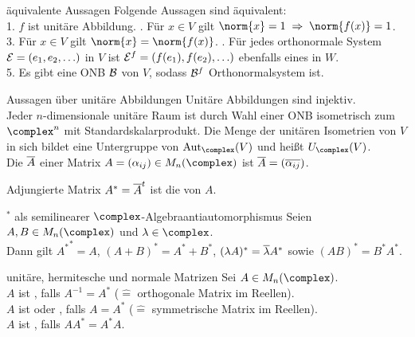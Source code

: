 \begin{Satz}{äquivalente Aussagen}
    Folgende Aussagen sind äquivalent: \\
    1. $f$ ist unitäre Abbildung. . Für $x \in V$ gilt
    $\norm{x} = 1 \;\Rightarrow\; \norm{f(x)} = 1$. \\
    3. Für $x \in V$ gilt $\norm{x} = \norm{f(x)}$. . Für jedes orthonormale System $\mathcal{E} = (e_1, e_2, \ldots)$ in $V$
    ist $\mathcal{E}^f = (f(e_1), f(e_2), \ldots)$ ebenfalls eines in $W$. \\
    5. Es gibt eine ONB $\mathcal{B}$ von $V$, sodass $\mathcal{B}^f$
    Orthonormalsystem ist.
\end{Satz}

\begin{Satz}{Aussagen über unitäre Abbildungen}
    Unitäre Abbildungen sind injektiv. \\
    Jeder $n$-dimen\-sionale unitäre Raum ist durch Wahl einer ONB isometrisch
    zum $\complex^n$ mit Standardskalarprodukt.
    Die Menge der unitären Isometrien von $V$ in sich bildet eine Untergruppe
    von $\Aut_\complex(V)$ und heißt 
    $U_\complex(V)$. \\
    Die  $\overline{A}$ einer Matrix
    $A = (\alpha_{ij}) \in M_n(\complex)$ ist $\overline{A} = (\overline{\alpha_{ij}})$.
\end{Satz}

\begin{Def}{Adjungierte Matrix}
    $A^\ast = \overline{A}^t$ ist die  von $A$.
\end{Def}

\begin{Lemma}{$^\ast$ als semilinearer $\complex$-Algebraantiautomorphismus}
    Seien $A, B \in M_n(\complex)$ und $\lambda \in \complex$. \\
    Dann gilt ${A^\ast}^\ast = A$, \qquad
    $(A + B)^\ast = A^\ast + B^\ast$, \qquad
    $(\lambda A)^\ast = \overline{\lambda} A^\ast$ \quad sowie \quad
    $(AB)^\ast = B^\ast A^\ast$.
\end{Lemma}

\begin{Def}{unitäre, hermitesche und normale Matrizen}
    Sei $A \in M_n(\complex)$. \\
    $A$ ist , falls $A^{-1} = A^\ast$ \qquad
    ($\mathrel{\widehat{=}}$ orthogonale Matrix im Reellen). \\
    $A$ ist  oder , falls
    $A = A^\ast$ \qquad
    ($\mathrel{\widehat{=}}$ symmetrische Matrix im Reellen). \\
    $A$ ist , falls $A A^\ast = A^\ast A$.
\end{Def}

